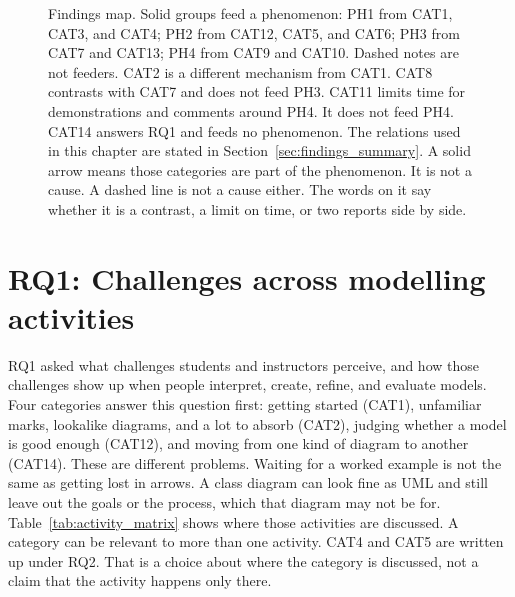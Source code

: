 \begin{figure}[htbp]
\centering

\caption{Findings map. Solid groups feed a phenomenon: PH1 from CAT1, CAT3, and CAT4; PH2 from CAT12, CAT5, and CAT6; PH3 from CAT7 and CAT13; PH4 from CAT9 and CAT10. Dashed notes are not feeders. CAT2 is a different mechanism from CAT1. CAT8 contrasts with CAT7 and does not feed PH3. CAT11 limits time for demonstrations and comments around PH4. It does not feed PH4. CAT14 answers RQ1 and feeds no phenomenon. The relations used in this chapter are stated in Section~\ref{sec:findings_summary}. A solid arrow means those categories are part of the phenomenon. It is not a cause. A dashed line is not a cause either. The words on it say whether it is a contrast, a limit on time, or two reports side by side.}
\label{fig:findings_map}
\end{figure}

\section{RQ1: Challenges across modelling activities}
\label{sec:findings_rq1}

RQ1 asked what challenges students and instructors perceive, and how those challenges show up when people interpret, create, refine, and evaluate models. Four categories answer this question first: getting started (CAT1), unfamiliar marks, lookalike diagrams, and a lot to absorb (CAT2), judging whether a model is good enough (CAT12), and moving from one kind of diagram to another (CAT14). These are different problems. Waiting for a worked example is not the same as getting lost in arrows. A class diagram can look fine as UML and still leave out the goals or the process, which that diagram may not be for. Table~\ref{tab:activity_matrix} shows where those activities are discussed. A category can be relevant to more than one activity. CAT4 and CAT5 are written up under RQ2. That is a choice about where the category is discussed, not a claim that the activity happens only there.

